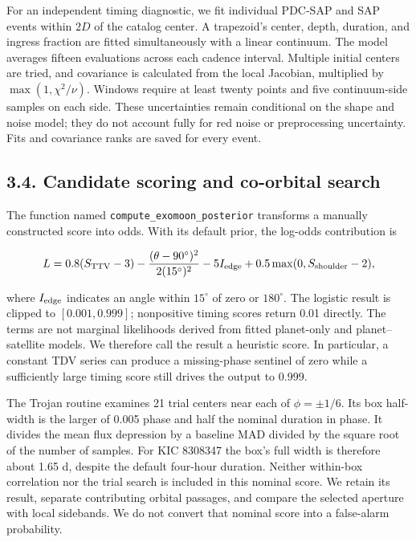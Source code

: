 \documentclass[
  english,
]{article}
\begin{document}
For an independent timing diagnostic, we fit individual PDC-SAP and SAP
events within \(2D\) of the catalog center. A trapezoid's center, depth,
duration, and ingress fraction are fitted simultaneously with a linear
continuum. The model averages fifteen evaluations across each cadence
interval. Multiple initial centers are tried, and covariance is
calculated from the local Jacobian, multiplied by
\(\max(1,\chi^2/\nu)\). Windows require at least twenty points and five
continuum-side samples on each side. These uncertainties remain
conditional on the shape and noise model; they do not account fully for
red noise or preprocessing uncertainty. Fits and covariance ranks are
saved for every event.

\subsection{3.4. Candidate scoring and co-orbital
search}\label{candidate-scoring-and-co-orbital-search}

The function named \texttt{compute\_exomoon\_posterior} transforms a
manually constructed score into odds. With its default prior, the
log-odds contribution is

\[
L=0.8(S_{\rm TTV}-3)-\frac{(\theta-90^\circ)^2}{2(15^\circ)^2}
-5I_{\rm edge}+0.5\max(0,S_{\rm shoulder}-2),
\]

where \(I_{\rm edge}\) indicates an angle within \(15^\circ\) of zero or
\(180^\circ\). The logistic result is clipped to \([0.001,0.999]\);
nonpositive timing scores return 0.01 directly. The terms are not
marginal likelihoods derived from fitted planet-only and
planet--satellite models. We therefore call the result a heuristic
score. In particular, a constant TDV series can produce a missing-phase
sentinel of zero while a sufficiently large timing score still drives
the output to 0.999.

The Trojan routine examines 21 trial centers near each of
\(\phi=\pm1/6\). Its box half-width is the larger of 0.005 phase and
half the nominal duration in phase. It divides the mean flux depression
by a baseline MAD divided by the square root of the number of samples.
For KIC 8308347 the box's full width is therefore about 1.65 d, despite
the default four-hour duration. Neither within-box correlation nor the
trial search is included in this nominal score. We retain its result,
separate contributing orbital passages, and compare the selected
aperture with local sidebands. We do not convert that nominal score into
a false-alarm probability.
\end{document}
